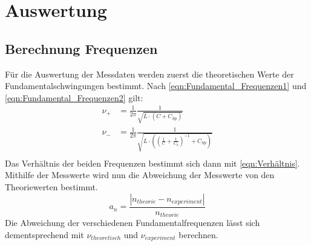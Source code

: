 \newpage
\section{Auswertung}

\subsection{Berechnung Frequenzen}Für die Auswertung der Messdaten werden zuerst die theoretischen Werte der Fundamentalschwingungen bestimmt.
Nach \ref{eqn:Fundamental_Frequenzen1} und \ref{eqn:Fundamental_Frequenzen2} gilt:
\begin{align*}
    \nu_+ &= \frac{1}{2\pi} \frac{1}{\sqrt{L\cdot \left(C + C_{Sp}\right)}}\\
    \nu_- &= \frac{1}{2\pi} \frac{1}{\sqrt{L\cdot \left(\left(\frac{1}{C}+\frac{1}{C_k}\right)^{-1} + C_{Sp}\right)}}\\
\end{align*}
Das Verhältnis der beiden Frequenzen bestimmt sich dann mit \ref{eqn:Verhältnis}.
Mithilfe der Messwerte wird nun die Abweichung der Messwerte von den Theoriewerten bestimmt.
\begin{equation}
    a_n = \frac{|n_{theorie} -n_{experiment}|}{n_{theorie}}
    \label{eqn:Abweichung}
\end{equation}
Die Abweichung der verschiedenen Fundamentalfrequenzen lässt sich dementsprechend mit $\nu_{theoretisch}$ und $\nu_{experiment}$ berechnen.

